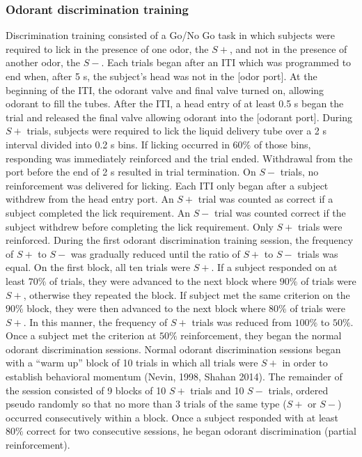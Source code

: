 \subsubsection{Odorant discrimination training}
Discrimination training consisted of a Go/No Go task in which subjects were required to lick in the presence of one odor, the $S+$, and not in the presence of another odor, the $S-$.  Each trials began after an ITI which was programmed to end when, after 5 s, the subject’s head was not in the [odor port]. At the beginning of the ITI, the odorant valve and final valve turned on, allowing odorant to fill the tubes. After the ITI, a head entry of at least 0.5 s began the trial and released the final valve allowing odorant into the [odorant port]. During $S+$ trials, subjects were required to lick the liquid delivery tube over a 2 s interval divided into 0.2 s bins. If licking occurred in $60\%$ of those bins, responding was immediately reinforced and the trial ended. Withdrawal from the port before the end of 2 s resulted in trial termination. On $S-$ trials, no reinforcement was delivered for licking. Each ITI only began after a subject withdrew from the head entry port. An $S+$ trial was counted as correct if a subject completed the lick requirement. An $S-$ trial was counted correct if the subject withdrew before completing the lick requirement. Only $S+$ trials were reinforced.
During the first odorant discrimination training session, the frequency of $S+$ to $S-$ was gradually reduced until the ratio of $S+$ to $S-$ trials was equal. On the first block, all ten trials were $S+$. If a subject responded on at least $70\%$ of trials, they were advanced to the next block where $90\%$ of trials were $S+$, otherwise they repeated the block. If subject met the same criterion on the $90\%$ block, they were then advanced to the next block where $80\%$ of trials were $S+$. In this manner, the frequency of $S+$ trials was reduced from $100\%$ to $50\%$.  Once a subject met the criterion at $50\%$ reinforcement, they began the normal odorant discrimination sessions.
Normal odorant discrimination sessions began with a ``warm up'' block of 10 trials in which all trials were $S+$ in order to establish behavioral momentum (Nevin, 1998, Shahan 2014).  The remainder of the session consisted of 9 blocks of 10 $S+$ trials and 10 $S-$ trials, ordered pseudo randomly so that no more than 3 trials of the same type ($S+$ or $S-$) occurred consecutively within a block. Once a subject responded with at least $80\%$ correct for two consecutive sessions, he began odorant discrimination (partial reinforcement).

